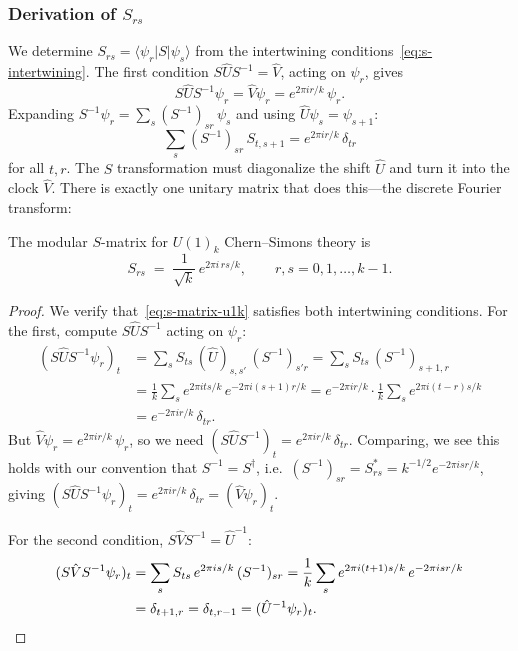 \subsubsection*{Derivation of $S_{rs}$}

We determine $S_{rs} = \langle \psi_r | S | \psi_s \rangle$ from the
intertwining conditions~\eqref{eq:s-intertwining}.  The first condition
$S \hat U S^{-1} = \hat V$, acting on $\psi_r$, gives
\begin{equation}
\label{eq:intertwine-step1}
    S \hat U S^{-1} \psi_r = \hat V \psi_r = e^{2\pi i r/k}\, \psi_r.
\end{equation}
Expanding $S^{-1}\psi_r = \sum_s (S^{-1})_{sr}\, \psi_s$ and using
$\hat U \psi_s = \psi_{s+1}$:
\begin{equation}
\label{eq:intertwine-step2}
    \sum_s (S^{-1})_{sr}\, S_{t,s+1} = e^{2\pi i r/k}\, \delta_{tr}
\end{equation}
for all $t, r$.  The $S$ transformation must diagonalize the shift $\hat U$ and
turn it into the clock $\hat V$.  There is exactly one unitary matrix that does
this---the discrete Fourier transform:

\begin{proposition}
\label{prop:u1k-s-matrix}
The modular $S$-matrix for $U(1)_k$ Chern--Simons theory is
\begin{equation}
\label{eq:s-matrix-u1k}
    S_{rs} \;=\; \frac{1}{\sqrt{k}}\, e^{2\pi i\, rs/k},
    \qquad r,s = 0, 1, \ldots, k-1.
\end{equation}
\end{proposition}

\begin{proof}
We verify that~\eqref{eq:s-matrix-u1k} satisfies both intertwining
conditions.  For the first, compute $S \hat U S^{-1}$ acting on $\psi_r$:
\begin{align}
\label{eq:verify-SUS}
    (S \hat U S^{-1} \psi_r)_t
    &= \sum_{s} S_{ts}\, (\hat U)_{s,s'}\, (S^{-1})_{s'r}
    = \sum_{s} S_{ts}\, (S^{-1})_{s+1,r} \nonumber\\
    &= \frac{1}{k} \sum_s e^{2\pi i ts/k}\, e^{-2\pi i(s+1)r/k}
    = e^{-2\pi i r/k} \cdot \frac{1}{k}\sum_s e^{2\pi i(t-r)s/k} \nonumber\\
    &= e^{-2\pi i r/k}\, \delta_{tr}.
\end{align}
But $\hat V \psi_r = e^{2\pi i r/k}\, \psi_r$, so we need
$(S \hat U S^{-1})_t = e^{2\pi i r/k}\,\delta_{tr}$.  Comparing, we see
this holds with our convention that $S^{-1} = S^\dagger$, i.e.\
$(S^{-1})_{sr} = S^*_{rs} = k^{-1/2} e^{-2\pi i sr/k}$, giving
$(S \hat U S^{-1}\psi_r)_t = e^{2\pi i r/k}\,\delta_{tr} = (\hat V\psi_r)_t$.

For the second condition, $S\hat V S^{-1} = \hat U^{-1}$:
\begin{align}
\label{eq:verify-SVS}
    (S \hat V S^{-1}\psi_r)_t
    &= \sum_s S_{ts}\, e^{2\pi is/k}\, (S^{-1})_{sr}
    = \frac{1}{k}\sum_s e^{2\pi i(t+1)s/k}\, e^{-2\pi i sr/k} \nonumber\\
    &= \delta_{t+1, r} = \delta_{t, r-1} = (\hat U^{-1}\psi_r)_t. \qedhere
\end{align}
\end{proof}

